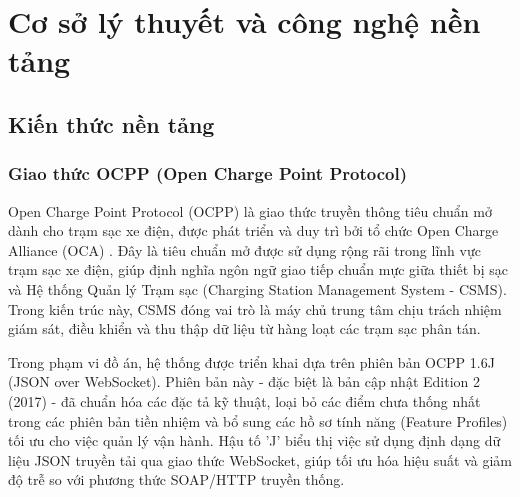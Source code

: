 \section{Cơ sở lý thuyết và công nghệ nền tảng}

\subsection{Kiến thức nền tảng}

\subsubsection{Giao thức OCPP (Open Charge Point Protocol)}
Open Charge Point Protocol (OCPP) là giao thức truyền thông tiêu chuẩn mở dành cho trạm sạc xe điện, được phát triển và duy trì bởi tổ chức Open Charge Alliance (OCA) \cite{ocpp_spec}. Đây là tiêu chuẩn mở được sử dụng rộng rãi trong lĩnh vực trạm sạc xe điện, giúp định nghĩa ngôn ngữ giao tiếp chuẩn mực giữa thiết bị sạc và Hệ thống Quản lý Trạm sạc (Charging Station Management System - CSMS). Trong kiến trúc này, CSMS đóng vai trò là máy chủ trung tâm chịu trách nhiệm giám sát, điều khiển và thu thập dữ liệu từ hàng loạt các trạm sạc phân tán.

Trong phạm vi đồ án, hệ thống được triển khai dựa trên phiên bản OCPP 1.6J (JSON over WebSocket). Phiên bản này - đặc biệt là bản cập nhật Edition 2 (2017) \cite{ocpp_spec} - đã chuẩn hóa các đặc tả kỹ thuật, loại bỏ các điểm chưa thống nhất trong các phiên bản tiền nhiệm và bổ sung các hồ sơ tính năng (Feature Profiles) tối ưu cho việc quản lý vận hành. Hậu tố 'J' biểu thị việc sử dụng định dạng dữ liệu JSON truyền tải qua giao thức WebSocket, giúp tối ưu hóa hiệu suất và giảm độ trễ so với phương thức SOAP/HTTP truyền thống.

